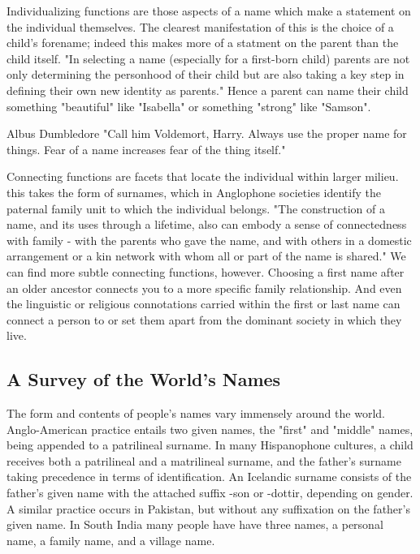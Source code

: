 Individualizing functions are those aspects of a name which make a statement on
the individual themselves. The clearest manifestation of this is the choice of a
child's forename; indeed this makes more of a statment on the parent than the
child itself. "In selecting a name (especially for a first-born child) parents
are not only determining the personhood of their child but are also taking a key
step in defining their own new identity as parents." \parencite[718]{finch08}
Hence a parent can name their child something "beautiful" like "Isabella" or
something "strong" like "Samson".

\begin{aquote}{Albus Dumbledore}
"Call him Voldemort, Harry. Always use the proper name for things. Fear of a
name increases fear of the thing itself." \parencite{rowling97}
\end{aquote}

Connecting functions are facets that locate the individual within larger milieu.
this takes the form of surnames, which in Anglophone societies identify the
paternal family unit to which the individual belongs. "The construction of a
name, and its uses through a lifetime, also can embody a sense of connectedness
with family - with the parents who gave the name, and with others in a domestic
arrangement or a kin network with whom all or part of the name is shared."
\parencite[711]{finch08} We can find more subtle connecting functions, however.
Choosing a first name after an older ancestor connects you to a more specific
family relationship. And even the linguistic or religious connotations carried
within the first or last name can connect a person to or set them apart from the
dominant society in which they live.

\subsection{A Survey of the World's Names}

The form and contents of people's names vary immensely around the world.
Anglo-American practice entails two given names, the "first" and "middle" names,
being appended to a patrilineal surname. In many Hispanophone cultures, a child
receives both a patrilineal and a matrilineal surname, and the father's surname
taking precedence in terms of identification. An Icelandic surname consists of
the father's given name with the attached suffix -son or -dottir, depending on
gender. A similar practice occurs in Pakistan, but without any suffixation on
the father's given name. In South India many people have have three names, a
personal name, a family name, and a village name.

